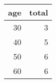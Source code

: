 
\begin{tabular}{r|r}
\hline
age & total\\
\hline
30 & 3\\
\hline
40 & 5\\
\hline
50 & 6\\
\hline
60 & 6\\
\hline
\end{tabular}
